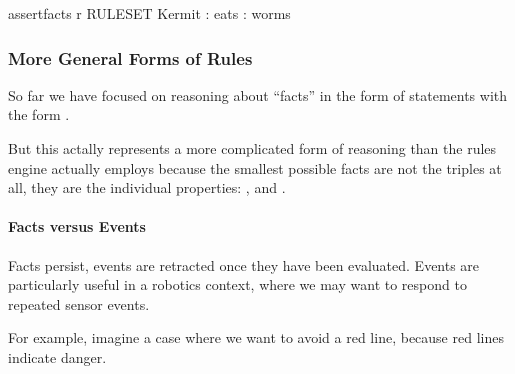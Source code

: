 \documentclass[letterpaper,10pt,english]{sphinxmanual}
\begin{document}
{
\begin{sphinxVerbatim}[commandchars=\\\{\}]
\llap{\color{nbsphinxin}[ ]:\,\hspace{\fboxrule}\hspace{\fboxsep}}\PYGZpc{}\PYGZpc{}assert\PYGZus{}facts \PYGZhy{}r RULESET
Kermit : eats : worms
\end{sphinxVerbatim}
}


\subsubsection{More General Forms of Rules}
\label{\detokenize{content/03_Robot_Lab/Section_00_04:More-General-Forms-of-Rules}}
So far we have focused on reasoning about “facts” in the form of statements with the form .

But this actally represents a more complicated form of reasoning than the rules engine actually employs because the  smallest possible facts are not the  triples at all, they are the individual properties: ,  and .


\paragraph{Facts versus Events}
\label{\detokenize{content/03_Robot_Lab/Section_00_04:Facts-versus-Events}}
Facts persist, events are retracted once they have been evaluated. Events are particularly useful in a robotics context, where we may want to respond to repeated sensor events.

For example, imagine a case where we want to avoid a red line, because red lines indicate danger.
\end{document}
